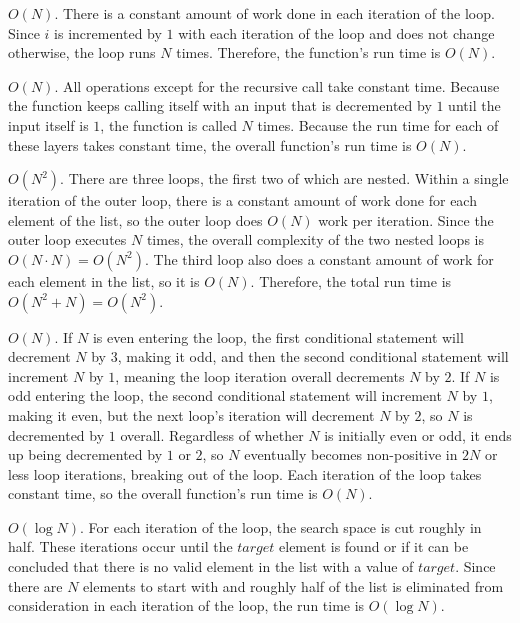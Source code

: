 \documentclass[12pt]{exam}
\begin{document}
\begin{solution}
\begin{qparts}
    \item $O(N)$. There is a constant amount of work done in each iteration of the loop. Since $i$ is incremented by $1$ with each iteration of the loop and does not change otherwise, the loop runs $N$ times. Therefore, the function's run time is $O(N)$.
    \item $O(N)$. All operations except for the recursive call take constant time. Because the function keeps calling itself with an input that is decremented by $1$ until the input itself is $1$, the function is called $N$ times. Because the run time for each of these layers takes constant time, the overall function's run time is $O(N)$.
    \item $O(N^2)$. There are three loops, the first two of which are nested. Within a single iteration of the outer loop, there is a constant amount of work done for each element of the list, so the outer loop does $O(N)$ work per iteration. Since the outer loop executes $N$ times, the overall complexity of the two nested loops is $O(N \cdot N) = O(N^2)$. The third loop also does a constant amount of work for each element in the list, so it is $O(N)$. Therefore, the total run time is $O(N^2 + N) = O(N^2)$.
    \item $O(N)$. If $N$ is even entering the loop, the first conditional statement will decrement $N$ by $3$, making it odd, and then the second conditional statement will increment $N$ by $1$, meaning the loop iteration overall decrements $N$ by $2$. If $N$ is odd entering the loop, the second conditional statement will increment $N$ by $1$, making it even, but the next loop's iteration will decrement $N$ by $2$, so $N$ is decremented by $1$ overall. Regardless of whether $N$ is initially even or odd, it ends up being decremented by $1$ or $2$, so $N$ eventually becomes non-positive in $2N$ or less loop iterations, breaking out of the loop. Each iteration of the loop takes constant time, so the overall function's run time is $O(N)$.
    \item $O(\log N)$. For each iteration of the loop, the search space is cut roughly in half. These iterations occur until the $target$ element is found or if it can be concluded that there is no valid element in the list with a value of $target$. Since there are $N$ elements to start with and roughly half of the list is eliminated from consideration in each iteration of the loop, the run time is $O(\log N)$.
\end{qparts}


\end{solution}
\end{document}
